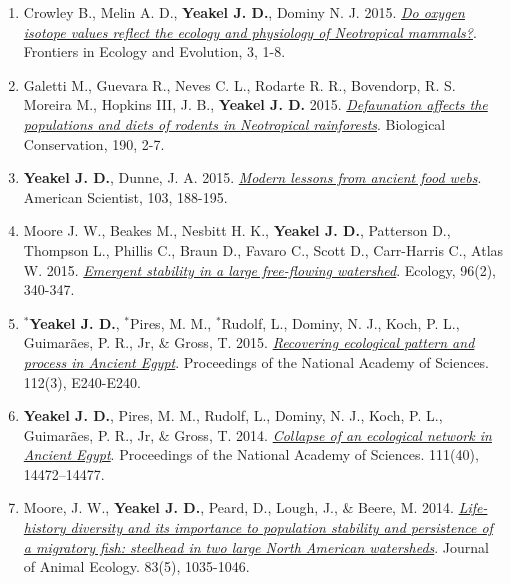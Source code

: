 \documentclass[margin,line,12pt]{res}
\begin{document}
\begin{resume}
\begin{enumerate}
\item Crowley B., Melin A. D., \textbf{Yeakel J. D.}, Dominy N. J. 2015. \href{https://www.frontiersin.org/articles/10.3389/fevo.2015.00127/full}{\emph{Do oxygen isotope values reflect the ecology and physiology of Neotropical mammals?}}. Frontiers in Ecology and Evolution, 3, 1-8.

\item Galetti M., Guevara R., Neves C. L., Rodarte R. R., Bovendorp, R. S. Moreira M., Hopkins III, J. B., \textbf{Yeakel J. D.} 2015. \href{https://www.sciencedirect.com/science/article/abs/pii/S000632071500186X}{\emph{Defaunation affects the populations and diets of rodents in Neotropical rainforests}}. Biological Conservation, 190, 2-7.

\item \textbf{Yeakel J. D.}, Dunne, J. A. 2015. \href{https://www.americanscientist.org/article/modern-lessons-from-ancient-food-webs}{\emph{Modern lessons from ancient food webs}}. American Scientist, 103, 188-195.

\item Moore J. W., Beakes M., Nesbitt H. K., \textbf{Yeakel J. D.}, Patterson D., Thompson L., Phillis C., Braun D., Favaro C., Scott D., Carr-Harris C., Atlas W. 2015. \href{https://esajournals.onlinelibrary.wiley.com/doi/full/10.1890/14-0326.1}{\emph{Emergent stability in a large free-flowing watershed}}. Ecology, 96(2), 340-347.

\item \textbf{${}^\ast$Yeakel J. D.}, ${}^\ast$Pires, M. M., ${}^\ast$Rudolf, L., Dominy, N. J., Koch, P. L., Guimar\~aes, P. R., Jr,
\& Gross, T. 2015. \href{https://www.pnas.org/content/early/2015/01/07/1422646112}{\emph{Recovering ecological pattern and process in Ancient Egypt}}. Proceedings of the National Academy of Sciences. 112(3), E240-E240.

\item \textbf{Yeakel J. D.}, Pires, M. M., Rudolf, L., Dominy, N. J., Koch, P. L., Guimar\~aes, P. R., Jr, \& Gross, T. 2014. \href{https://www.pnas.org/content/111/40/14472}{\emph{Collapse of an ecological network in Ancient Egypt}}. Proceedings of the National Academy of Sciences. 111(40), 14472–14477.

\item Moore, J. W., \textbf{Yeakel J. D.}, Peard, D., Lough, J., \& Beere, M. 2014. \href{https://besjournals.onlinelibrary.wiley.com/doi/10.1111/1365-2656.12212}{\emph{Life-history diversity and its importance to population stability and persistence of a migratory fish: steelhead in two large North American watersheds}}. Journal of Animal Ecology. 83(5), 1035-1046.


\end{enumerate}
\end{resume}
\end{document}
